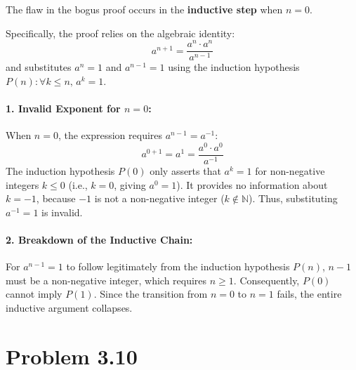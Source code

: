\documentclass[12pt]{article}
\begin{document}
The flaw in the bogus proof occurs in the \textbf{inductive step} when \(n = 0\).

Specifically, the proof relies on the algebraic identity:
\[
a^{n+1} = \frac{a^n \cdot a^n}{a^{n-1}}
\]
and substitutes \(a^n = 1\) and \(a^{n-1} = 1\) using the induction hypothesis\\ \(P(n) : \forall k \le n, \, a^k = 1\).

\paragraph{1. Invalid Exponent for \(n = 0\):}
When \(n = 0\), the expression requires \(a^{n-1} = a^{-1}\):
\[
a^{0+1} = a^1 = \frac{a^0 \cdot a^0}{a^{-1}}
\]
The induction hypothesis \(P(0)\) only asserts that \(a^k = 1\) for non-negative integers \(k \le 0\) (i.e., \(k = 0\), giving \(a^0 = 1\)). It provides no information about \(k = -1\), because \(-1\) is not a non-negative integer (\(k \notin \mathbb{N}\)). Thus, substituting \(a^{-1} = 1\) is invalid.

\paragraph{2. Breakdown of the Inductive Chain:}
For \(a^{n-1} = 1\) to follow legitimately from the induction hypothesis \(P(n)\), \(n - 1\) must be a non-negative integer, which requires \(n \ge 1\). Consequently, \(P(0)\) cannot imply \(P(1)\). Since the transition from \(n = 0\) to \(n = 1\) fails, the entire inductive argument collapses.


\section*{Problem 3.10}
\end{document}
